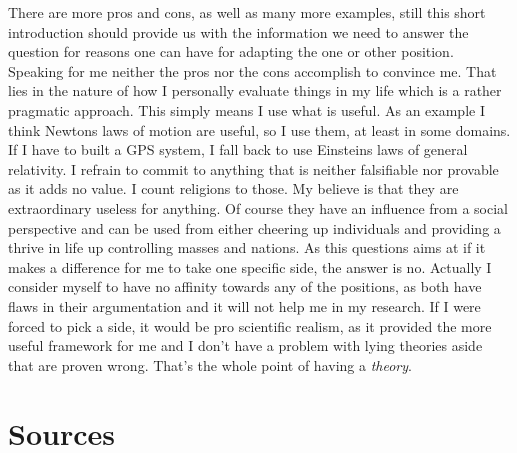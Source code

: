 \documentclass[11pt]{scrartcl}
\begin{document}
There are more pros and cons, as well as many more examples, still this short introduction should provide us with the information we need to answer the question for reasons one can have for adapting the one or other position. Speaking for me neither the pros nor the cons accomplish to convince me. That lies in the nature of how I personally evaluate things in my life which is a rather pragmatic approach. This simply means I use what is useful. As an example I think Newtons laws of motion are useful, so I use them, at least in some domains. If I have to built a GPS system, I fall back to use Einsteins laws of general relativity. I refrain to commit to anything that is neither falsifiable nor provable as it adds no value. I count religions to those. My believe is that they are extraordinary useless for anything. Of course they have an influence from a social perspective and can be used from either cheering up individuals and providing a thrive in life up controlling masses and nations. As this questions aims at if it makes a difference for me to take one specific side, the answer is no. Actually I consider myself to have no affinity towards any of the positions, as both have flaws in their argumentation and it will not help me in my research. If I were forced to pick a side, it would be pro scientific realism, as it provided the more useful framework for me and I don't have a problem with lying theories aside that are proven wrong. That's the whole point of having a \textit{theory}.



\section{Sources}



\end{document}
